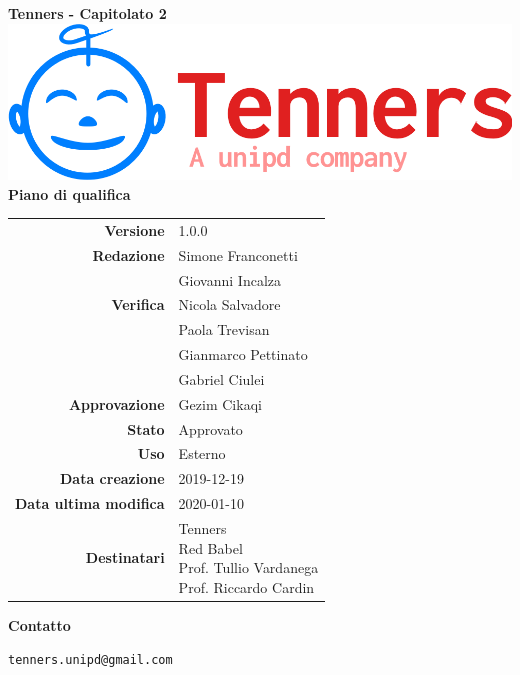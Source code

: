 \begin{titlepage}
	\begin{center}
		\large \textbf{Tenners - Capitolato 2}
		\vfill
		\includegraphics[scale = 0.3]{./res/img/logo.png}\\
		\vfill
		\Huge \textbf{Piano di qualifica}

        \vfill
        \large

        \begin{tabular}{r|l}
                        \textbf{Versione} & 1.0.0 \\
                        \textbf{Redazione} &
                        Simone Franconetti \\&
                        Giovanni Incalza \\
                        \textbf{Verifica} &
                        Nicola Salvadore \\&
                        Paola Trevisan \\&
												Gianmarco Pettinato \\&
												Gabriel Ciulei \\
                        \textbf{Approvazione} & Gezim Cikaqi \\
                        \textbf{Stato} & Approvato \\
                        \textbf{Uso} &  Esterno\\
                        \textbf{Data creazione} &  2019-12-19\\
                        \textbf{Data ultima modifica} &  2020-01-10\\
                        \textbf{Destinatari} & \parbox[t]{5cm}{Tenners\\Red Babel\\Prof. Tullio Vardanega\\Prof. Riccardo Cardin}
                \end{tabular}
                \vfill
                \normalsize
                \vfill
                \textbf{Contatto}

                \texttt{tenners.unipd@gmail.com}

	\end{center}
\end{titlepage}
